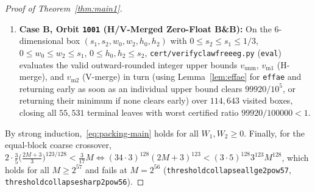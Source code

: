 \documentclass[11pt,reqno]{amsart}
\theoremstyle{plain}
\theoremstyle{definition}
\theoremstyle{remark}
\DeclareRobustCommand{\_}{\ifmmode\text{\textunderscore}\else\textunderscore\allowbreak\fi}
\begin{document}
\begin{proof}[Proof of Theorem~\ref{thm:main1}]
\begin{enumerate}[label=(\alph*),leftmargin=2em]
\begin{itemize}[leftmargin=1.4em]
    \item \emph{Orbit \texttt{1111} (real $379,133$-weighted supporting line):} Positive $k_U, k_V > 0$ partition $u_B, u_T \in [0, s_{1,h}/D]$ into $k_U$ bins ($0 \le i \le j < k_U$ by horizontal reflection symmetry $u_B \le u_T$, grouping by $s = i + j \in [0, 2k_U - 2]$). Since $i \le j$, we have $d_U - 3 s_{1,h} j \le d_U - 3 s_{1,h} i$ and $(d_U - 3 s_{1,h} i)/(3 d_U) \le 1/3$ (grid index $\le \lceil 2048/3 \rceil = 683 \le 692$), so \texttt{pupGrid\_mono\_on\_grid} gives the exact weight ordering $p_{w,j} \le p_{w,i}$. Applying Lemma~\ref{lem:real-bridge}(ii) at midpoint $M = s_{2,h}/(2D) + \varepsilon_0 > 0$ (where $t_1 + t_2 \le s_{2,h}/D \implies (t_1 + 2/m) + (t_2 + 2/m) \le 2M$ and $M^\alpha \le \mathrm{pS2Half}/S$ by \texttt{pupEGrid\_sound}) bounds the real edge sum directly by $\mathrm{prodUpD}(\lceil(379 p_{w,i} + 133 p_{w,j})/256\rceil, \mathrm{pS2Half}) / S$, dominated over all valid $i \in [\max(0, s + 1 - k_U), \lfloor s/2 \rfloor]$ by \texttt{maxTangentForSum\_sound}; symmetrically for $v_L \le v_R$, while $u_B + u_T \le s_{1,h}(s + 2)/d_U$ bounds the $4$-corner H\"older factor~\eqref{eq:1111-holder}.
  \end{itemize}
  \item \textbf{Case B, Orbit \texttt{1001} (H/V-Merged Zero-Float B\&B):} On the $6$-dimensional box $(s_1, s_2, w_0, w_2, h_0, h_2)$ with $0 \le s_2 \le s_1 \le 1/3$, $0 \le w_0 \le w_2 \le s_1$, $0 \le h_0, h_2 \le s_2$, \texttt{cert/verify\_clawfree\_eg.py} (\texttt{eval\_1001}) evaluates the valid outward-rounded integer upper bounds $v_{\mathrm{unm}}$, $v_{\mathrm{m1}}$ (H-merge), and $v_{\mathrm{m2}}$ (V-merge) in turn (using Lemma~\ref{lem:effae} for \texttt{eff\_a\_e} and returning early as soon as an individual upper bound clears $99920/10^5$, or returning their minimum if none clears early) over $114{,}643$ visited boxes, closing all $55{,}531$ terminal leaves with worst certified ratio $99920/100000 < 1$.
\end{enumerate}
By strong induction,~\eqref{eq:packing-main} holds for all $W_1, W_2 \ge 0$. Finally, for the equal-block coarse crossover, $2 \cdot \frac{3}{5}\bigl(\frac{2M + 3}{3}\bigr)^{123/128} < \frac{3}{17} M \iff (34 \cdot 3)^{128} (2M + 3)^{123} < (3 \cdot 5)^{128} 3^{123} M^{128}$, which holds for all $M \ge 2^{57}$ and fails at $M = 2^{56}$ (\texttt{threshold\_collapse\_all\_ge\_2pow57}, \texttt{threshold\_collapse\_sharp\_2pow56}).
\end{proof}

\end{document}
